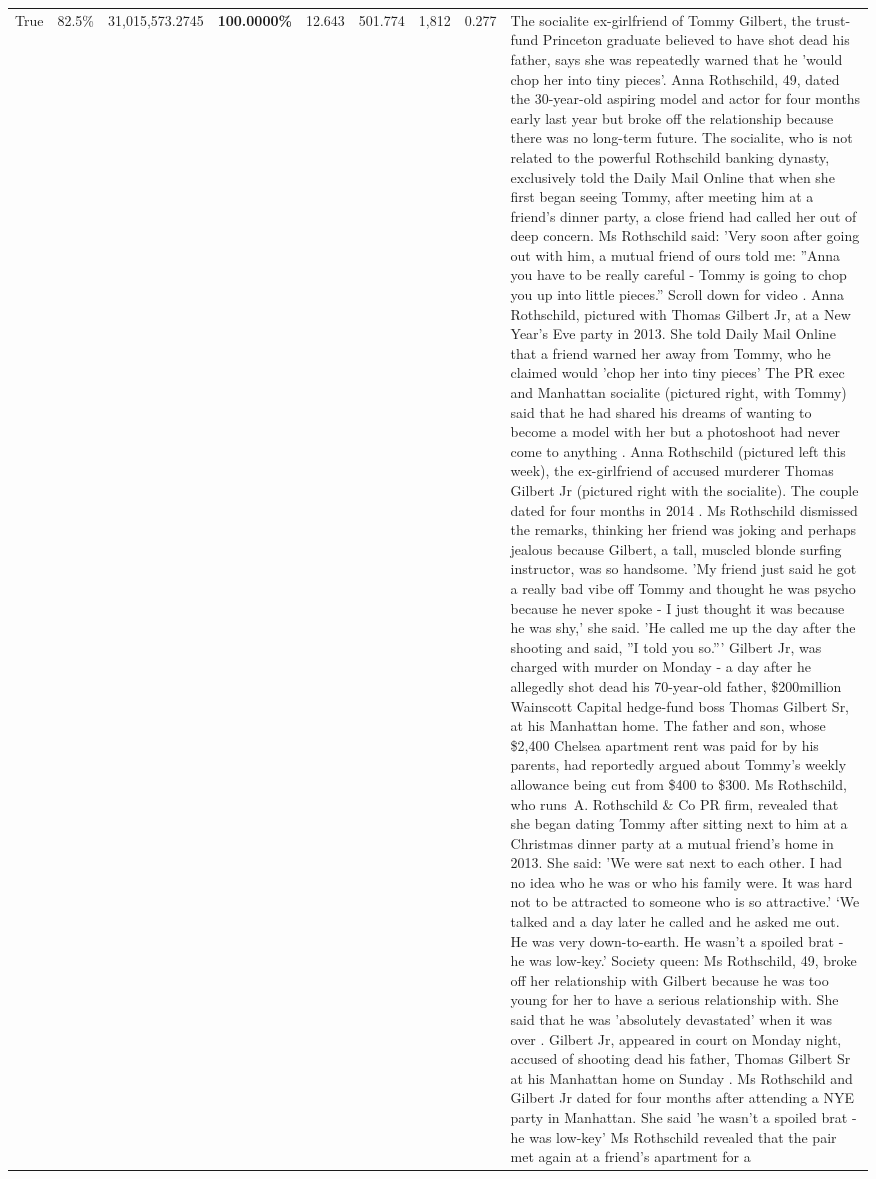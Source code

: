 \begin{table}[H]
\begin{tabular}{lllrlllll}
True & 82.5\% & 31,015,573.2745 & \bfseries \color{red} 100.0000\% & 12.643 & 501.774 & 1,812 & 0.277 & The socialite ex-girlfriend of Tommy Gilbert, the trust-fund Princeton graduate believed to have shot dead his father, says she was repeatedly warned that he 'would chop her into tiny pieces'. Anna Rothschild, 49, dated the 30-year-old aspiring model and actor for four months early last year but broke off the relationship because there was no long-term future. The socialite, who is not related to the powerful Rothschild banking dynasty, exclusively told the Daily Mail Online that when she first began seeing Tommy, after meeting him at a friend's dinner party, a close friend had called her out of deep concern. Ms Rothschild said: 'Very soon after going out with him, a mutual friend of ours told me: ''Anna you have to be really careful - Tommy is going to chop you up into little pieces.'' Scroll down for video . Anna Rothschild, pictured with Thomas Gilbert Jr, at a New Year's Eve party in 2013. She told Daily Mail Online that a friend warned her away from Tommy, who he claimed would 'chop her into tiny pieces' The PR exec and Manhattan socialite (pictured right, with Tommy) said that he had shared his dreams of wanting to become a model with her but a photoshoot had never come to anything . Anna Rothschild (pictured left this week), the ex-girlfriend of accused murderer Thomas Gilbert Jr (pictured right with the socialite). The couple dated for four months in 2014 . Ms Rothschild dismissed the remarks, thinking her friend was joking and perhaps jealous because Gilbert, a tall, muscled blonde surfing instructor, was so handsome. 'My friend just said he got a really bad vibe off Tommy and thought he was psycho because he never spoke - I just thought it was because he was shy,' she said. 'He called me up the day after the shooting and said, ''I told you so.''' Gilbert Jr, was charged with murder on Monday - a day after he allegedly shot dead his 70-year-old father, \$200million Wainscott Capital hedge-fund boss Thomas Gilbert Sr, at his Manhattan home. The father and son, whose \$2,400 Chelsea apartment rent was paid for by his parents, had reportedly argued about Tommy's weekly allowance being cut from \$400 to \$300. Ms Rothschild, who runs A. Rothschild \& Co PR firm, revealed that she began dating Tommy after sitting next to him at a Christmas dinner party at a mutual friend's home in 2013. She said: 'We were sat next to each other. I had no idea who he was or who his family were. It was hard not to be attracted to someone who is so attractive.' ‘We talked and a day later he called and he asked me out. He was very down-to-earth. He wasn’t a spoiled brat - he was low-key.’ Society queen: Ms Rothschild, 49, broke off her relationship with Gilbert because he was too young for her to have a serious relationship with. She said that he was 'absolutely devastated' when it was over . Gilbert Jr, appeared in court on Monday night, accused of shooting dead his father, Thomas Gilbert Sr at his Manhattan home on Sunday . Ms Rothschild and Gilbert Jr dated for four months after attending a NYE party in Manhattan. She said 'he wasn't a spoiled brat - he was low-key' Ms Rothschild revealed that the pair met again at a friend’s apartment for a 
\end{tabular}
\end{table}
